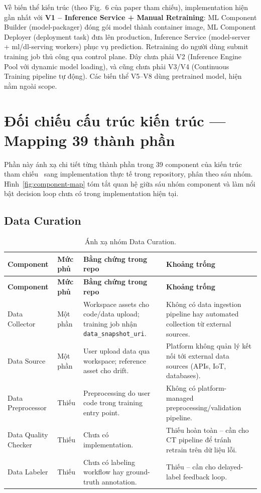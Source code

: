 \documentclass[11pt,a4paper]{article}
\newcommand{\statuspartial}{\textcolor{orange!75!black}{Một phần}}
\newcommand{\statusno}{\textcolor{red!60!black}{Thiếu}}
\newcommand{\codepath}[1]{\texttt{\small #1}}
\begin{document}
Về biến thể kiến trúc (theo Fig.~6 của paper tham chiếu), implementation hiện gần nhất với \textbf{V1 -- Inference Service + Manual Retraining}: ML Component Builder (model-packager) đóng gói model thành container image, ML Component Deployer (deployment task) đưa lên production, Inference Service (model-server + ml/dl-serving workers) phục vụ prediction. Retraining do người dùng submit training job thủ công qua control plane. Đây chưa phải V2 (Inference Engine Pool với dynamic model loading), và cũng chưa phải V3/V4 (Continuous Training pipeline tự động). Các biến thể V5--V8 dùng pretrained model, hiện nằm ngoài scope.

\section{Đối chiếu cấu trúc kiến trúc --- Mapping 39 thành phần}

Phần này ánh xạ chi tiết từng thành phần trong 39 component của kiến trúc tham chiếu~\cite{najafabadi2026} sang implementation thực tế trong repository, phân theo sáu nhóm.
Hình~\ref{fig:component-map} tóm tắt quan hệ giữa sáu nhóm component và làm nổi bật decision loop chưa có trong implementation hiện tại.

\subsection{Data Curation}

\begin{longtable}{@{}P{2.6cm}P{1.6cm}P{4.7cm}P{4.5cm}@{}}
\caption{Ánh xạ nhóm Data Curation.}\\
\toprule
\textbf{Component} & \textbf{Mức phủ} & \textbf{Bằng chứng trong repo} & \textbf{Khoảng trống} \\
\midrule
\endfirsthead
\toprule
\textbf{Component} & \textbf{Mức phủ} & \textbf{Bằng chứng trong repo} & \textbf{Khoảng trống} \\
\midrule
\endhead
Data Collector & \statuspartial & Workspace assets cho code/data upload; training job nhận \codepath{data\_snapshot\_uri}. & Không có data ingestion pipeline hay automated collection từ external sources. \\
\addlinespace
Data Source & \statuspartial & User upload data qua workspace; reference asset cho drift. & Platform không quản lý kết nối tới external data sources (APIs, IoT, databases). \\
\addlinespace
Data Preprocessor & \statusno & Preprocessing do user code trong training entry point. & Không có platform-managed preprocessing/validation pipeline. \\
\addlinespace
Data Quality Checker & \statusno & Chưa có implementation. & Thiếu hoàn toàn -- cần cho CT pipeline để tránh retrain trên dữ liệu lỗi. \\
\addlinespace
Data Labeler & \statusno & Chưa có labeling workflow hay ground-truth annotation. & Thiếu -- cần cho delayed-label feedback loop. \\
\bottomrule
\end{longtable}
\end{document}
